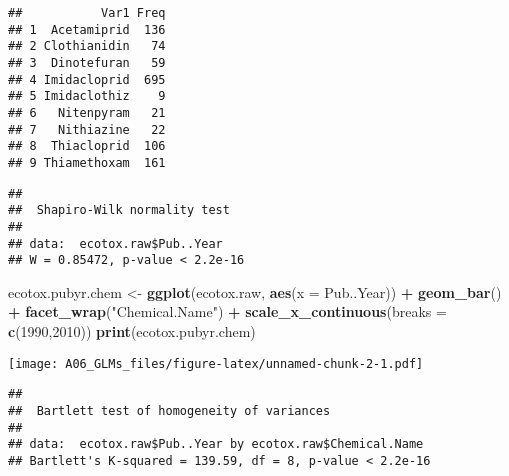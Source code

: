 \documentclass[]{article}
\newenvironment{Shaded}{\begin{snugshade}}{\end{snugshade}}
\newcommand{\KeywordTok}[1]{\textcolor[rgb]{0.13,0.29,0.53}{\textbf{#1}}}
\newcommand{\DataTypeTok}[1]{\textcolor[rgb]{0.13,0.29,0.53}{#1}}
\newcommand{\DecValTok}[1]{\textcolor[rgb]{0.00,0.00,0.81}{#1}}
\newcommand{\StringTok}[1]{\textcolor[rgb]{0.31,0.60,0.02}{#1}}
\newcommand{\CommentTok}[1]{\textcolor[rgb]{0.56,0.35,0.01}{\textit{#1}}}
\newcommand{\OperatorTok}[1]{\textcolor[rgb]{0.81,0.36,0.00}{\textbf{#1}}}
\newcommand{\NormalTok}[1]{#1}
\begin{document}
\begin{verbatim}
##           Var1 Freq
## 1  Acetamiprid  136
## 2 Clothianidin   74
## 3  Dinotefuran   59
## 4 Imidacloprid  695
## 5 Imidaclothiz    9
## 6   Nitenpyram   21
## 7   Nithiazine   22
## 8  Thiacloprid  106
## 9 Thiamethoxam  161
\end{verbatim}

\begin{Shaded}
\end{Shaded}

\begin{verbatim}
## 
##  Shapiro-Wilk normality test
## 
## data:  ecotox.raw$Pub..Year
## W = 0.85472, p-value < 2.2e-16
\end{verbatim}

\begin{Shaded}
\begin{Highlighting}[]
\NormalTok{ecotox.pubyr.chem <-}\StringTok{ }\KeywordTok{ggplot}\NormalTok{(ecotox.raw, }\KeywordTok{aes}\NormalTok{(}\DataTypeTok{x =}\NormalTok{ Pub..Year)) }\OperatorTok{+}
\StringTok{  }\KeywordTok{geom_bar}\NormalTok{() }\OperatorTok{+}
\StringTok{  }\KeywordTok{facet_wrap}\NormalTok{(}\StringTok{"Chemical.Name"}\NormalTok{) }\OperatorTok{+}
\StringTok{  }\KeywordTok{scale_x_continuous}\NormalTok{(}\DataTypeTok{breaks =} \KeywordTok{c}\NormalTok{(}\DecValTok{1990}\NormalTok{,}\DecValTok{2010}\NormalTok{))}
\KeywordTok{print}\NormalTok{(ecotox.pubyr.chem)}
\end{Highlighting}
\end{Shaded}

\texttt{[image: A06\_GLMs\_files/figure-latex/unnamed-chunk-2-1.pdf]}

\begin{Shaded}
\end{Shaded}

\begin{verbatim}
## 
##  Bartlett test of homogeneity of variances
## 
## data:  ecotox.raw$Pub..Year by ecotox.raw$Chemical.Name
## Bartlett's K-squared = 139.59, df = 8, p-value < 2.2e-16
\end{verbatim}
\end{document}
